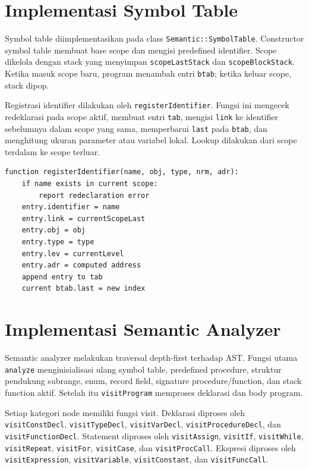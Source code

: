 \section{Implementasi Symbol Table}
Symbol table diimplementasikan pada class \texttt{Semantic::SymbolTable}. Constructor symbol table membuat base scope dan mengisi predefined identifier. Scope dikelola dengan stack yang menyimpan \texttt{scopeLastStack} dan \texttt{scopeBlockStack}. Ketika masuk scope baru, program menambah entri \texttt{btab}; ketika keluar scope, stack dipop.

Registrasi identifier dilakukan oleh \texttt{registerIdentifier}. Fungsi ini mengecek redeklarasi pada scope aktif, membuat entri \texttt{tab}, mengisi \texttt{link} ke identifier sebelumnya dalam scope yang sama, memperbarui \texttt{last} pada \texttt{btab}, dan menghitung ukuran parameter atau variabel lokal. Lookup dilakukan dari scope terdalam ke scope terluar.

\begin{tcolorbox}[title=Pseudocode Register Identifier,colback=gray!5,colframe=black!60,boxrule=0.5pt,arc=2mm]
    \begin{verbatim}
function registerIdentifier(name, obj, type, nrm, adr):
    if name exists in current scope:
        report redeclaration error
    entry.identifier = name
    entry.link = currentScopeLast
    entry.obj = obj
    entry.type = type
    entry.lev = currentLevel
    entry.adr = computed address
    append entry to tab
    current btab.last = new index
\end{verbatim}
\end{tcolorbox}

\section{Implementasi Semantic Analyzer}
Semantic analyzer melakukan traversal depth-first terhadap AST. Fungsi utama \texttt{analyze} menginisialisasi ulang symbol table, predefined procedure, struktur pendukung subrange, enum, record field, signature procedure/function, dan stack function aktif. Setelah itu \texttt{visitProgram} memproses deklarasi dan body program.

Setiap kategori node memiliki fungsi visit. Deklarasi diproses oleh \texttt{visitConstDecl}, \texttt{visitTypeDecl}, \texttt{visitVarDecl}, \texttt{visitProcedureDecl}, dan \texttt{visitFunctionDecl}. Statement diproses oleh \texttt{visitAssign}, \texttt{visitIf}, \texttt{visitWhile}, \texttt{visitRepeat}, \texttt{visitFor}, \texttt{visitCase}, dan \texttt{visitProcCall}. Ekspresi diproses oleh \texttt{visitExpression}, \texttt{visitVariable}, \texttt{visitConstant}, dan \texttt{visitFuncCall}.

